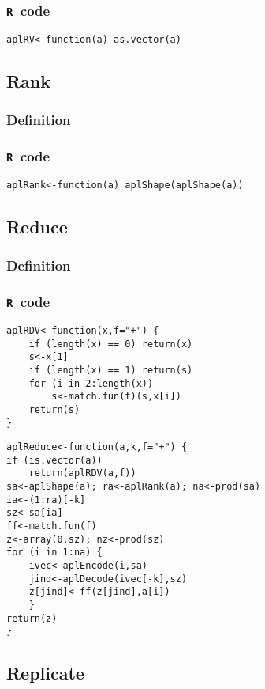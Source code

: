 \documentclass[11pt]{amsart}
\theoremstyle{plain}
\theoremstyle{definition}
\theoremstyle{remark}
\newcommand{\tR}{\texttt{R}}
\begin{document}
\subsubsection{\tR\ code}\quad
\begin{lstlisting}
aplRV<-function(a) as.vector(a)
\end{lstlisting}

\subsection{Rank}\quad
\subsubsection{Definition}
\subsubsection{\tR\ code}\quad
\begin{lstlisting}
aplRank<-function(a) aplShape(aplShape(a))
\end{lstlisting}

\subsection{Reduce}\quad
\subsubsection{Definition}
\subsubsection{\tR\ code}\quad
\begin{lstlisting}
aplRDV<-function(x,f="+") {
    if (length(x) == 0) return(x)
    s<-x[1]
    if (length(x) == 1) return(s)
    for (i in 2:length(x))
        s<-match.fun(f)(s,x[i])
    return(s)
}
\end{lstlisting}
\begin{lstlisting}
aplReduce<-function(a,k,f="+") {
if (is.vector(a))
    return(aplRDV(a,f))
sa<-aplShape(a); ra<-aplRank(a); na<-prod(sa)
ia<-(1:ra)[-k]
sz<-sa[ia]
ff<-match.fun(f)
z<-array(0,sz); nz<-prod(sz)
for (i in 1:na) {
    ivec<-aplEncode(i,sa)
    jind<-aplDecode(ivec[-k],sz)
    z[jind]<-ff(z[jind],a[i])
    }
return(z)
}
\end{lstlisting}

\subsection{Replicate}\quad
\end{document}

